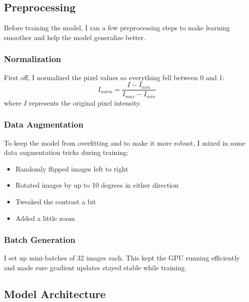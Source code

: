 \documentclass[conference]{IEEEtran}
\begin{document}

\subsection{\textbf{Preprocessing}}
Before training the model, I ran a few preprocessing steps to make learning smoother and help the model generalize better.
\subsubsection{Normalization}
First off, I normalized the pixel values so everything fell between 0 and 1:
\begin{equation}
I_{norm} = \frac{I - I_{min}}{I_{max} - I_{min}}
\end{equation}
where \( I \) represents the original pixel intensity.
\subsubsection{Data Augmentation}
To keep the model from overfitting and to make it more robust, I mixed in some data augmentation tricks during training:
\begin{itemize}
    \item Randomly flipped images left to right
    \item Rotated images by up to 10 degrees in either direction
    \item Tweaked the contrast a bit
    \item Added a little zoom
\end{itemize}
\subsubsection{Batch Generation}
I set up mini-batches of 32 images each. This kept the GPU running efficiently and made sure gradient updates stayed stable while training.


\subsection{Model Architecture}
\end{document}
